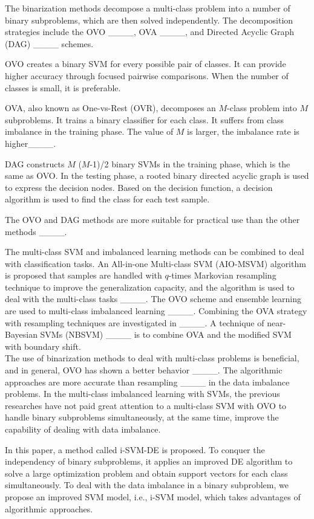 The binarization methods decompose a multi-class problem into a number of binary subproblems, which are then solved independently. The decomposition strategies include the OVO ____, OVA ____, and Directed Acyclic Graph (DAG) ____ schemes. 

OVO creates a binary SVM for every possible pair of classes. It can provide higher accuracy through focused pairwise comparisons. When the number of classes is small, it is preferable. 


OVA, also known as One-vs-Rest (OVR), decomposes an $M$-class problem into $M$ subproblems. It trains a binary classifier for each class. It suffers from class imbalance in the training phase. The value of $M$ is larger, the imbalance rate is higher____.


DAG constructs $M$ ($M$-1)/2 binary SVMs in the training phase, which is the same as OVO. In the testing phase, a rooted binary directed acyclic graph is used to express the decision nodes. Based on the decision function, a decision algorithm is used to find the class for each test sample.


The OVO and DAG methods are more suitable for practical use than the other methods ____. 


The multi-class SVM and imbalanced learning methods can be combined to deal with classification tasks. An All-in-one Multi-class SVM (AIO-MSVM) algorithm is proposed that samples are handled with $q$-times Markovian resampling technique to improve the generalization capacity, and the algorithm is used to deal with the multi-class tasks ____. The OVO scheme and ensemble learning are used to multi-class imbalanced learning ____. Combining the OVA strategy with resampling techniques are investigated in ____. A technique of near-Bayesian SVMs (NBSVM) ____ is to combine OVA and the modified SVM with boundary shift. 
~\\

The use of binarization methods to deal with multi-class problems is beneficial, and in general, OVO has shown a better behavior ____. The algorithmic approaches are more accurate than resampling ____ in the data imbalance problems. In the multi-class imbalanced learning with SVMs, the previous researches have not paid great attention to a multi-class SVM with OVO to handle binary subproblems simultaneously, at the same time, improve the capability of dealing with data imbalance. 

In this paper, a method called i-SVM-DE is proposed. To conquer the independency of binary subproblems, it applies an improved DE algorithm to solve a large optimization problem and obtain support vectors for each class simultaneously. To deal with the data imbalance in a binary subproblem, we propose an improved SVM model, i.e., i-SVM model, which takes advantages of algorithmic approaches. 


